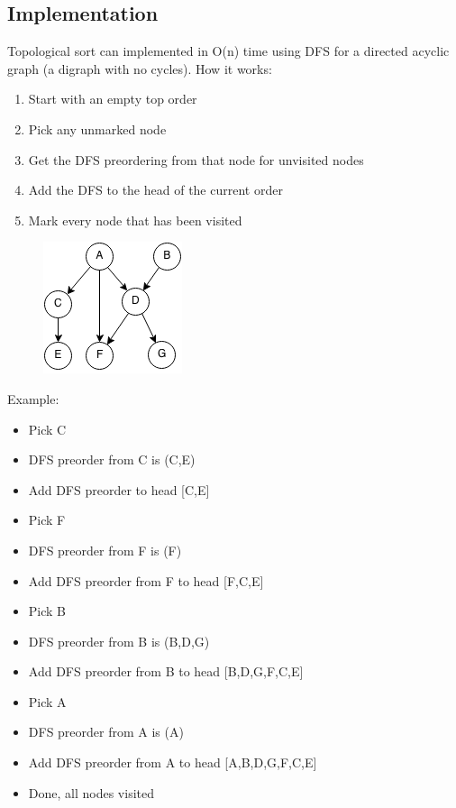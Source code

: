 \documentclass[11pt,oneside]{book}
\makeatletter
\def\maxwidth#1{\ifdim\Gin@nat@width>#1 #1\else\Gin@nat@width\fi}
\makeatother
\begin{document}
\subsection{Implementation}

Topological sort can implemented in O(n) time using DFS for a directed acyclic graph (a digraph with no cycles). How it works:

\begin{enumerate}
\item Start with an empty top order
\item Pick any unmarked node
\item Get the DFS preordering from that node for unvisited nodes 
\item Add the DFS to the head of the current order
\item Mark every node that has been visited
\end{enumerate}

\vspace{5px}\begin{figure}[H]\centering
        \includegraphics[width=0.66\maxwidth{\textwidth}]{topsort.png}
        \end{figure}

Example:

\begin{itemize}
\item Pick C
\item DFS preorder from C is (C,E)
\item Add DFS preorder to head [C,E]
\item Pick F
\item DFS preorder from F is (F)
\item Add DFS preorder from F to head [F,C,E]
\item Pick B
\item DFS preorder from B is (B,D,G)
\item Add DFS preorder from B to head [B,D,G,F,C,E]
\item Pick A
\item DFS preorder from A is (A)
\item Add DFS preorder from A to head [A,B,D,G,F,C,E]
\item Done, all nodes visited
\end{itemize}
\end{document}
